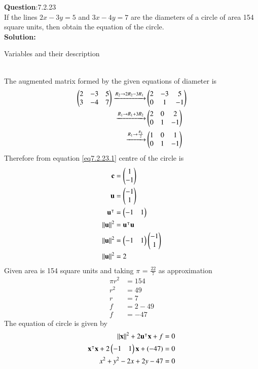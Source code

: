 \documentclass[journal]{IEEEtran}
\begin{document}
\textbf{Question}:7.2.23\\
If the lines $2x - 3y = 5$ and $3x - 4y = 7$ are the diameters of a circle of area 154 square units, then obtain the equation of the circle.
\\
\textbf{Solution:}
\renewcommand{\tablename}{Table 7.2.23.1}
\begin{table}[h!]
  \centering
  
  \caption{Variables and their description}
\end{table}
\\
The augmented matrix formed by the given equations of diameter is
\begin{align}
    \begin{pmatrix}2 & -3 & 5 \\ 3 & -4 & 7\end{pmatrix} \xrightarrow[]{R_2 \rightarrow 2R_2 - 3R_1} & \begin{pmatrix}2 & -3 & 5 \\ 0 & 1 & -1\end{pmatrix} \\
    \xrightarrow[]{R_1 \rightarrow R_1 + 3R_2} & \begin{pmatrix}2 & 0 & 2 \\ 0 & 1 & -1\end{pmatrix} \\
    \xrightarrow[]{R_1 \rightarrow \frac{R_1}{2}} & \begin{pmatrix}1 & 0 & 1 \\ 0 & 1 & -1\end{pmatrix} \label{eq7.2.23.1}
\end{align}
Therefore from equation \ref{eq7.2.23.1} centre of the circle is
\begin{align}
    \mathbf{c} & = \begin{pmatrix}1 \\ -1\end{pmatrix} \\
    \mathbf{u} & = \begin{pmatrix}-1 \\ 1\end{pmatrix} \\
    \mathbf{u}^\intercal & = \begin{pmatrix}-1 & 1\end{pmatrix} \\
    \lVert\mathbf{u}\rVert^2 & = \mathbf{u}^\intercal \mathbf{u} \\
    \lVert\mathbf{u}\rVert^2 & = \begin{pmatrix}-1 & 1\end{pmatrix}\begin{pmatrix}-1 \\ 1\end{pmatrix} \\
    \lVert\mathbf{u}\rVert^2 & = 2
    \end{align}
Given area is 154 square units and taking $\pi$ = $\frac{22}{7}$ as approximation
\begin{align}
    \pi r^2 & = 154 \\
    r^2 & = 49 \\
    r & = 7 \\
    f & = 2 - 49 \\
    f & = -47
\end{align}
The equation of circle is given by
\begin{align}
    \lVert\mathbf{x}\rVert^2 + 2\mathbf{u}^\intercal\mathbf{x} + f & = 0 \\
    \mathbf{x}^\intercal\mathbf{x} + 2\begin{pmatrix}-1 & 1\end{pmatrix}\mathbf{x} + (-47) & = 0 \\
    x^2 + y^2 - 2x + 2y - 47 & = 0
\end{align}
\end{document}
